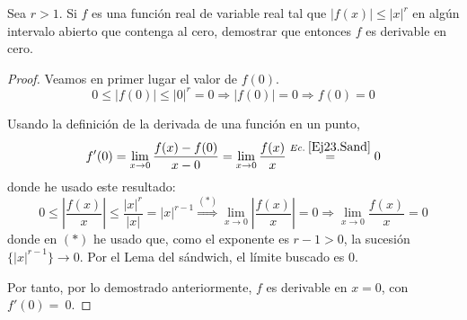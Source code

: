 \begin{ejercicio}
    Sea $r>1$. Si $f$ es una función real de variable real tal que $|f(x)|\leq |x|^r$ en algún intervalo abierto que contenga al cero, demostrar que entonces $f$ es derivable en cero.
    \begin{proof}
        Veamos en primer lugar el valor de $f(0)$.
        $$0 \leq |f(0)| \leq |0|^r = 0 \Longrightarrow |f(0)| = 0 \Longrightarrow f(0) = 0$$
    
        Usando la definición de la derivada de una función en un punto,
        \begin{equation*}
            f'(0)=\lim_{x\to 0} \frac{f(x)-f(0)}{x-0} = \lim_{x\to 0} \frac{f(x)}{x} \stackrel{Ec.\;\ref{Ej23.Sand}}{=} 0
        \end{equation*}
        donde he usado este resultado:
        \begin{equation}\label{Ej23.Sand}
            0 \leq \left|\frac{f(x)}{x}\right| \leq \frac{|x|^r}{|x|}
            = |x|^{r-1} \stackrel{(\ast)}{\Longrightarrow} \lim_{x\to 0} \left|\frac{f(x)}{x}\right| = 0 \Longrightarrow \lim_{x\to 0} \frac{f(x)}{x} = 0
        \end{equation}
        donde en $(\ast)$ he usado que, como el exponente es $r-1>0$, la sucesión $\{|x|^{r-1}\}\longrightarrow 0$. Por el Lema del sándwich, el límite buscado es 0.
    
        Por tanto, por lo demostrado anteriormente, $f$ es derivable en $x=0$, con $f'(0)=~0$.
    \end{proof}
\end{ejercicio}

